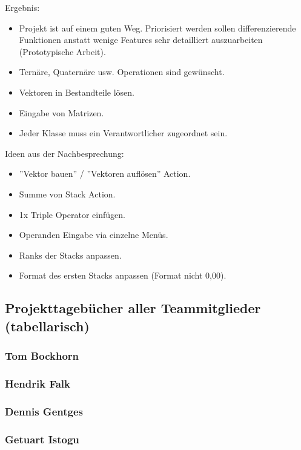 Ergebnis:

\begin{itemize}
	\item Projekt ist auf einem guten Weg. Priorisiert werden sollen differenzierende Funktionen anstatt wenige Features sehr detailliert auszuarbeiten (Prototypische Arbeit).
	\item Ternäre, Quaternäre usw. Operationen sind gewünscht.
	\item Vektoren in Bestandteile lösen.
	\item Eingabe von Matrizen.
	\item Jeder Klasse muss ein Verantwortlicher zugeordnet sein.
\end{itemize}

Ideen aus der Nachbesprechung:

\begin{itemize}
	\item ''Vektor bauen'' / ''Vektoren auflösen'' Action. 
	\item Summe von Stack Action.
	\item 1x Triple Operator einfügen.
	\item Operanden Eingabe via einzelne Menüs.
	\item Ranks der Stacks anpassen.
	\item Format des ersten Stacks anpassen (Format nicht 0,00).
\end{itemize}

\subsection{Projekttagebücher aller Teammitglieder (tabellarisch)}

\subsubsection{Tom Bockhorn}

\subsubsection{Hendrik Falk}

\subsubsection{Dennis Gentges}

\subsubsection{Getuart Istogu}

